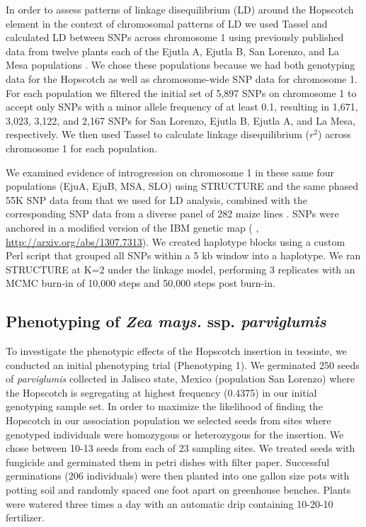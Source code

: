 \documentclass[12pt]{article}
\begin{document}
In order to assess patterns of linkage disequilibrium (LD) around the Hopscotch element in the context of chromosomal patterns of LD we used Tassel \cite{Bradbury et al 2007} and calculated LD between SNPs across chromosome 1 using previously published data from twelve plants each of the Ejutla A, Ejutla B, San Lorenzo, and La Mesa populations \cite{Pyhajarvi et al 2013}. We chose these populations because we had both genotyping data for the Hopscotch as well as chromosome-wide SNP data for chromosome 1. For each population we filtered the initial set of 5,897 SNPs on chromosome 1 to accept only SNPs with a minor allele frequency of at least 0.1, resulting in 1,671, 3,023, 3,122, and 2,167 SNPs for San Lorenzo, Ejutla B, Ejutla A, and La Mesa, respectively. We then used Tassel \cite{Bradbury et al 2007} to calculate linkage disequilibrium ($r^{2}$) across chromosome 1 for each population. 

We examined evidence of introgression on chromosome 1 in these same four populations (EjuA, EjuB, MSA, SLO) using STRUCTURE \cite{Falush et al 2003} and the same phased 55K SNP data from \cite{Pyhajarvi et al 2013} that we used for LD analysis, combined with the corresponding SNP data from a diverse panel of 282 maize lines \cite{Cook et al 2012}. SNPs were anchored in a modified version of the IBM genetic map ( \cite{Gerke et al 2013}, \url{http://arxiv.org/abs/1307.7313}). We created haplotype blocks using a custom Perl script that grouped all SNPs within a 5 kb window into a haplotype. We ran STRUCTURE at K=2 under the linkage model, performing 3 replicates with an MCMC burn-in of 10,000 steps and 50,000 steps post burn-in. 

\subsection*{Phenotyping of \emph{Zea mays.} ssp. \emph{parviglumis}}

To investigate the phenotypic effects of the Hopscotch insertion in teosinte, we conducted an initial phenotyping trial (Phenotyping 1). We germinated 250 seeds of \emph{parviglumis} collected in Jalisco state, Mexico (population San Lorenzo) \cite{Hufford 2010} where the Hopscotch is segregating at highest frequency (0.4375) in our initial genotyping sample set. In order to maximize the likelihood of finding the Hopscotch in our association population we selected seeds from sites where genotyped individuals were homozygous or heterozygous for the insertion. We chose between 10-13 seeds from each of 23 sampling sites. We treated seeds with fungicide and germinated them in petri dishes with filter paper. Successful germinations (206 individuals) were then planted into one gallon size pots with potting soil and randomly spaced one foot apart on greenhouse benches. Plants were watered three times a day with an automatic drip containing 10-20-10 fertilizer. 
\end{document}

